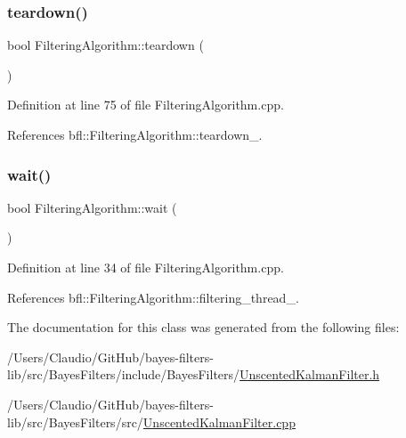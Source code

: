 \mbox{\label{classbfl_1_1FilteringAlgorithm_a1dc912d89ee8f96d4f3e8209865c5308}} 
\subsubsection{\texorpdfstring{teardown()}{teardown()}}
{\footnotesize\ttfamily bool Filtering\+Algorithm\+::teardown (\begin{DoxyParamCaption}{ }\end{DoxyParamCaption})\hspace{0.3cm}{\ttfamily [inherited]}}



Definition at line 75 of file Filtering\+Algorithm.\+cpp.



References bfl\+::\+Filtering\+Algorithm\+::teardown\+\_\+.

\mbox{\label{classbfl_1_1FilteringAlgorithm_a40372c24fa050eb0274371172df0a244}} 
\subsubsection{\texorpdfstring{wait()}{wait()}}
{\footnotesize\ttfamily bool Filtering\+Algorithm\+::wait (\begin{DoxyParamCaption}{ }\end{DoxyParamCaption})\hspace{0.3cm}{\ttfamily [inherited]}}



Definition at line 34 of file Filtering\+Algorithm.\+cpp.



References bfl\+::\+Filtering\+Algorithm\+::filtering\+\_\+thread\+\_\+.



The documentation for this class was generated from the following files\+:\begin{DoxyCompactItemize}
\item 
/\+Users/\+Claudio/\+Git\+Hub/bayes-\/filters-\/lib/src/\+Bayes\+Filters/include/\+Bayes\+Filters/\mbox{\hyperlink{UnscentedKalmanFilter_8h}{Unscented\+Kalman\+Filter.\+h}}\item 
/\+Users/\+Claudio/\+Git\+Hub/bayes-\/filters-\/lib/src/\+Bayes\+Filters/src/\mbox{\hyperlink{UnscentedKalmanFilter_8cpp}{Unscented\+Kalman\+Filter.\+cpp}}\end{DoxyCompactItemize}
